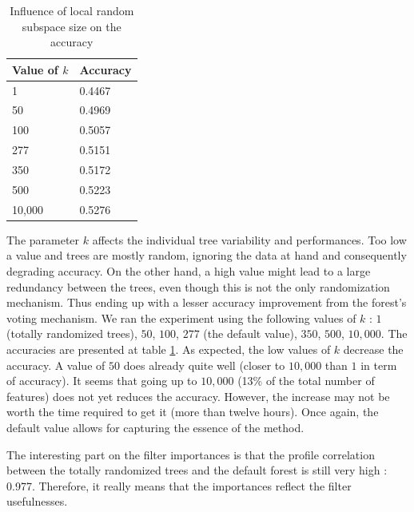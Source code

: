 \documentclass[a4paper]{report}
\newlength{\larg}
\begin{document}
		\begin{table}
			\centering
				\begin{tabular}{l|l}
				\hline
				Value of $k$ & Accuracy\\
				\hline \hline
				1 &  0.4467 \\
				50 & 0.4969 \\
				100 & 0.5057 \\
				277 & 0.5151 \\
				350 & 0.5172 \\
				500 & 0.5223 \\
				10,000 & 0.5276 \\
				\hline
				\end{tabular}
			\caption{\label{tab:AccFK}Influence of local random subspace size on the accuracy}
		\end{table}
		
		The parameter $k$ affects the individual tree variability and performances. Too low a value and trees are mostly random, ignoring the data at hand and consequently degrading accuracy. On the other hand, a high value might lead to a large redundancy between the trees, even though this is not the only randomization mechanism. Thus ending up with a lesser accuracy improvement from the forest's voting mechanism. 
		We ran the experiment using the following values of $k$ : $1$ (totally randomized trees), $50$, $100$, $277$ (the default value), $350$, $500$, $10,000$. The accuracies are presented at table \ref{tab:AccFK}. 
		As expected, the low values of $k$ decrease the accuracy. A value of $50$ does already quite well (closer to $10,000$ than $1$ in term of accuracy). It seems that going up to $10,000$ (13\% of the total number of features) does not yet reduces the accuracy. However, the increase may not be worth the time required to get it (more than twelve hours). Once again, the default value allows for capturing the essence of the method.
		\par
		The interesting part on the filter importances is that the profile correlation between the totally randomized trees and the default forest is still very high : 0.977. Therefore, it really means that the importances reflect the  filter usefulnesses.
		
		
		
		
		
		
		
\end{document}
